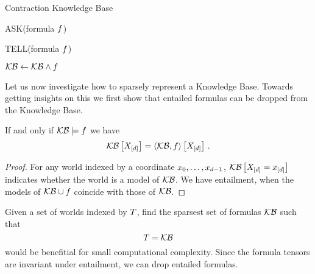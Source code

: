 \begin{algorithm}[hbt!]
\caption{Contraction Knowledge Base}\label{alg:TensorKB}
ASK(formula $f$)
\begin{algorithmic}
	\State{$\hypercoreat{\formulavar} \algdefsymbol \sbcontractionof{\kb,\rencodingof{\exformula}}{\formulavar}$}
	\EndIf
	\EndIf
\end{algorithmic}
TELL(formula $f$)
\begin{algorithmic}
	\State $\mathcal{KB} \leftarrow \mathcal{KB}\land f$%
	\EndIf
\end{algorithmic}

\end{algorithm}





Let us now investigate how to sparsely represent a Knowledge Base.
Towards getting insights on this we first show that entailed formulas can be dropped from the Knowledge Base.

\begin{theorem}\label{the:ReduncancyOfEntailed}
	If and only if $\mathcal{KB} \models f$ we have
		\[ \mathcal{KB}\left[X_{[d]}\right]= \left\langle \mathcal{KB},f\right\rangle \left[ X_{[d]} \right]  \, . \]
\end{theorem}
\begin{proof}
	For any world indexed by a coordinate ${x_{0},\ldots,x_{d-1}}$, $\mathcal{KB}\left[X_{[d]}=x_{[d]}\right]$ indicates whether the world is a model of $\mathcal{KB}$.
	We have entailment, when the models of $\mathcal{KB}\cup f$ coincide with those of $\mathcal{KB}$.
\end{proof}


\begin{remark}
	Given a set of worlds indexed by $T$, find the sparsest set of formulas $\mathcal{KB}$ such that
		\[ T = {\mathcal{KB}} \]
	would be benefitial for small computational complexity.
	Since the formula tensors are invariant under entailment, we can drop entailed formulas.
\end{remark}	





